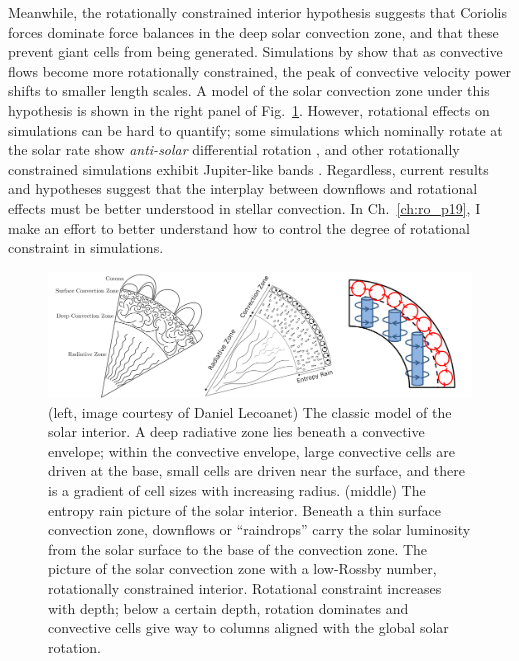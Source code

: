 Meanwhile, the rotationally constrained interior hypothesis suggests that Coriolis forces dominate force balances in the deep solar convection zone, and that these prevent giant cells from being generated.
Simulations by \cite{featherstone&hindman2016a, featherstone&hindman2016b} show that as convective flows become more rotationally constrained, the peak of convective velocity power shifts to smaller length scales.
A model of the solar convection zone under this hypothesis is shown in the right panel of Fig.~\ref{fig:conundrum_solns}.
However, rotational effects on simulations can be hard to quantify; some simulations which nominally rotate at the solar rate show \emph{anti-solar} differential rotation \citep{gastine&all2014}, and other rotationally constrained simulations exhibit Jupiter-like bands \citep{brun&all2017}.
Regardless, current results and hypotheses suggest that the interplay between downflows and rotational effects must be better understood in stellar convection.
In Ch.~\ref{ch:ro_p19}, I make an effort to better understand how to control the degree of rotational constraint in simulations.

\begin{figure}[t!]
\includegraphics[width=\textwidth]{./figs/intro/conundrum_explanations.pdf}
\caption[Schematics of hypotheses that solve the convective conundrum.]
{
	(left, image courtesy of Daniel Lecoanet) The classic model of the solar interior.
	A deep radiative zone lies beneath a convective envelope; within the convective envelope, large convective cells are driven at the base, small cells are driven near the surface, and there is a gradient of cell sizes with increasing radius.
	(middle) The entropy rain picture of the solar interior.
	Beneath a thin surface convection zone, downflows or ``raindrops'' carry the solar luminosity from the solar surface to the base of the convection zone. 
	\citep[right, Fig.~3c of][]{featherstone&hindman2016b} The picture of the solar convection zone with a low-Rossby number, rotationally constrained interior.
	Rotational constraint increases with depth; below a certain depth, rotation dominates and convective cells give way to columns aligned with the global solar rotation.
	\label{fig:conundrum_solns} 
}
\end{figure}


